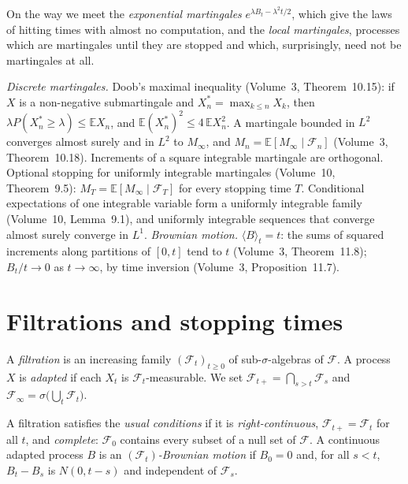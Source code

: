 On the way we meet the \emph{exponential martingales} $e^{\lambda B_t-\lambda^2t/2}$, which give the laws of hitting times with almost no computation, and the \emph{local martingales},
processes which are martingales until they are stopped and which, surprisingly, need not be martingales at all.

\begin{reminder}
\emph{Discrete martingales.} Doob's maximal inequality (Volume~3, Theorem~10.15): if $X$ is a non-negative submartingale and $X^*_n=\max_{k\le n}X_k$, then $\lambda P(X^*_n\ge\lambda)\le\mathbb E X_n$, and
$\mathbb E(X^*_n)^2\le4\,\mathbb EX_n^2$. A martingale bounded in $L^2$ converges almost surely and in $L^2$ to $M_\infty$, and $M_n=\mathbb E[M_\infty\mid\mathcal F_n]$ (Volume~3, Theorem~10.18).
Increments of a square integrable martingale are orthogonal. Optional stopping for uniformly integrable martingales (Volume~10, Theorem~9.5): $M_T=\mathbb E[M_\infty\mid\mathcal F_T]$ for every
stopping time $T$. Conditional expectations of one integrable variable form a uniformly integrable family (Volume~10, Lemma~9.1), and uniformly integrable sequences that converge almost
surely converge in $L^1$. \emph{Brownian motion.} $\langle B\rangle_t=t$: the sums of squared increments along partitions of $[0,t]$ tend to $t$ (Volume~3, Theorem~11.8); $B_t/t\to0$ as $t\to\infty$, by
time inversion (Volume~3, Proposition~11.7).
\end{reminder}

\section{Filtrations and stopping times}

A \emph{filtration} is an increasing family $(\mathcal F_t)_{t\ge0}$ of sub-$\sigma$-algebras of $\mathcal F$. A process $X$ is \emph{adapted} if each $X_t$ is $\mathcal F_t$-measurable. We set
$\mathcal F_{t+}=\bigcap_{s>t}\mathcal F_s$ and $\mathcal F_\infty=\sigma\bigl(\bigcup_t\mathcal F_t\bigr)$.

\begin{definition}\label{def:usual}
A filtration satisfies the \emph{usual conditions} if it is \emph{right-continuous}, $\mathcal F_{t+}=\mathcal F_t$ for all $t$, and \emph{complete}: $\mathcal F_0$ contains every subset of a
null set of $\mathcal F$. A continuous adapted process $B$ is an \emph{$(\mathcal F_t)$-Brownian motion} if $B_0=0$ and, for all $s<t$, $B_t-B_s$ is $N(0,t-s)$ and independent of $\mathcal F_s$.
\end{definition}

